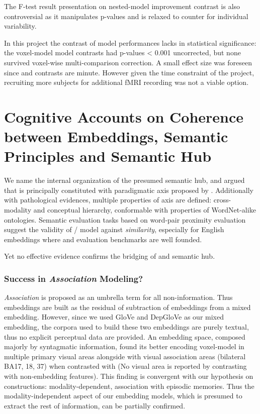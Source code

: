 The F-test result presentation on nested-model improvement contrast is also controversial as it manipulates p-values and is relaxed to counter for individual variability.

In this project the contrast of model performances lacks in statistical significance: the voxel-model model contrasts had p-values < 0.001 uncorrected, but none survived voxel-wise multi-comparison correction. A small effect size was foreseen since \similarity and \association contrasts are minute. However given the time constraint of the project, recruiting more subjects for additional fMRI recording was not a viable option.

\section{Cognitive Accounts on Coherence between Embeddings, Semantic Principles and Semantic Hub}

We name \similarity the internal organization of the presumed semantic hub, and argued that \similarity is principally constituted with paradigmatic axis proposed by \citeauthor{jakobsonFundamentalsLanguage1963}. Additionally with pathological evidences, multiple properties of \similarity axis are defined: cross-modality and conceptual hierarchy, conformable with properties of WordNet-alike ontologies. Semantic evaluation tasks based on word-pair proximity evaluation suggest the validity of / model against \emph{similarity}, especially for English embeddings where  and evaluation benchmarks are well founded.

Yet no effective evidence confirms the bridging of \similarity and semantic hub. 

\subsubsection{Success in \emph{Association} Modeling?}

\emph{Association} is proposed as an umbrella term for all non-\similarity information. Thus  embeddings are built as the residual of subtraction of \similarity embeddings from a mixed embedding. However, since we used GloVe and DepGloVe as our mixed embedding, the corpora used to build these two embeddings are purely textual, thus no explicit perceptual data are provided. An embedding space, composed majorly by syntagmatic information, found its better encoding voxel-model in multiple primary visual areas alongside with visual association areas (bilateral BA17, 18, 37) when contrasted with \similarity (No visual area is reported by contrasting  with non-embedding features). This finding is convergent with our hypothesis on \association constructions: modality-dependent, association with episodic memories. Thus the modality-independent aspect of our \similarity embedding models, which is presumed to extract the rest of information, can be partially confirmed.

